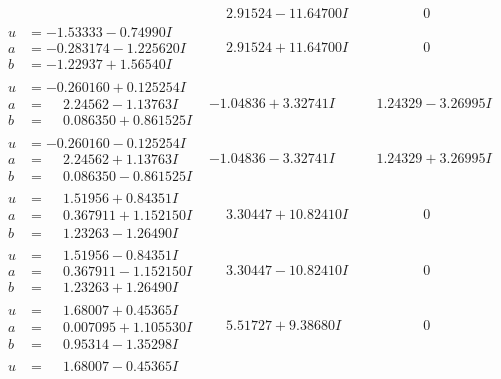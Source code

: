 \documentclass[1p]{elsarticle_modified}
\theoremstyle{definition}
\begin{document}
$$\begin{array}{c|c|c}
 & \phantom{-}2.91524 - 11.64700 I & \phantom{-0.000000 } 0 \\ \hline\begin{aligned}
u &= -1.53333 - 0.74990 I \\
a &= -0.283174 - 1.225620 I \\
b &= -1.22937 + 1.56540 I\end{aligned}
 & \phantom{-}2.91524 + 11.64700 I & \phantom{-0.000000 } 0 \\ \hline\begin{aligned}
u &= -0.260160 + 0.125254 I \\
a &= \phantom{-}2.24562 - 1.13763 I \\
b &= \phantom{-}0.086350 + 0.861525 I\end{aligned}
 & -1.04836 + 3.32741 I & \phantom{-}1.24329 - 3.26995 I \\ \hline\begin{aligned}
u &= -0.260160 - 0.125254 I \\
a &= \phantom{-}2.24562 + 1.13763 I \\
b &= \phantom{-}0.086350 - 0.861525 I\end{aligned}
 & -1.04836 - 3.32741 I & \phantom{-}1.24329 + 3.26995 I \\ \hline\begin{aligned}
u &= \phantom{-}1.51956 + 0.84351 I \\
a &= \phantom{-}0.367911 + 1.152150 I \\
b &= \phantom{-}1.23263 - 1.26490 I\end{aligned}
 & \phantom{-}3.30447 + 10.82410 I & \phantom{-0.000000 } 0 \\ \hline\begin{aligned}
u &= \phantom{-}1.51956 - 0.84351 I \\
a &= \phantom{-}0.367911 - 1.152150 I \\
b &= \phantom{-}1.23263 + 1.26490 I\end{aligned}
 & \phantom{-}3.30447 - 10.82410 I & \phantom{-0.000000 } 0 \\ \hline\begin{aligned}
u &= \phantom{-}1.68007 + 0.45365 I \\
a &= \phantom{-}0.007095 + 1.105530 I \\
b &= \phantom{-}0.95314 - 1.35298 I\end{aligned}
 & \phantom{-}5.51727 + 9.38680 I & \phantom{-0.000000 } 0 \\ \hline\begin{aligned}
u &= \phantom{-}1.68007 - 0.45365 I \\

\end{aligned}
\end{array}$$
\end{document}

